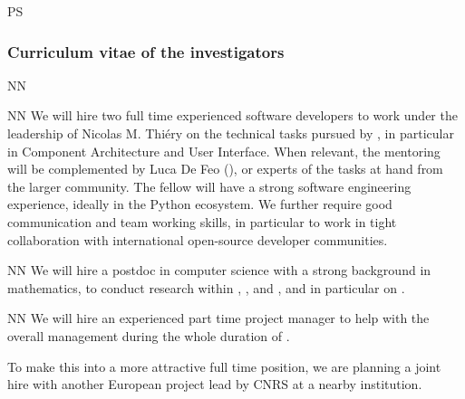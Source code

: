 \begin{sitedescription}{PS}

\subsubsection*{Curriculum vitae of the investigators}


%





\begin{participant}[type=res,PM=48,salary=5500]{NN}
\end{participant}
\begin{participant}[type=res,PM=36,salary=5500]{NN}
  We will hire two full time experienced software developers to work
  under the leadership of Nicolas M. Thiéry on the technical tasks
  pursued by , in particular in
   Component Architecture and 
  User Interface. When relevant, the mentoring will be complemented by
  Luca De Feo (), or experts of the tasks at hand from the
  larger community.
  The fellow will have a strong software engineering experience,
  ideally in the Python ecosystem. We further require good
  communication and team working skills, in particular to work in
  tight collaboration with international open-source developer
  communities.
\end{participant}

\begin{participant}[type=res,PM=24,salary=4650]{NN}
  We will hire a postdoc in computer science with a strong
  background in mathematics, to conduct research within
  , , and ,
  and in particular on .
\end{participant}

\begin{participant}[type=res,PM=24,salary=3932]{NN}
  We will hire an experienced part time project manager to help with
  the overall management during the whole duration of \TheProject.

  To make this into a more attractive full time position, we are
  planning a joint hire with another European project lead by CNRS at
  a nearby institution.
\end{participant}


\end{sitedescription}

